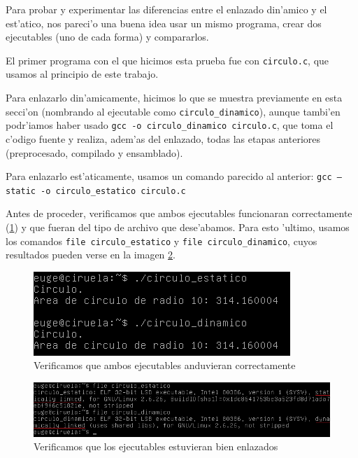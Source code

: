 \documentclass[11pt]{article}
\begin{document}
		Para probar y experimentar las diferencias entre el enlazado din'amico y el est'atico, nos pareci'o una buena idea usar un mismo programa, crear dos ejecutables (uno de cada forma) y compararlos.

		El primer programa con el que hicimos esta prueba fue con \texttt{circulo.c}, que usamos al principio de este trabajo.

		Para enlazarlo din'amicamente, hicimos lo que se muestra previamente en esta secci'on (nombrando al ejecutable como \texttt{circulo\_dinamico}), aunque tambi'en podr'iamos haber usado \texttt{gcc -o circulo\_dinamico circulo.c}, que toma el c'odigo fuente y realiza, adem'as del enlazado, todas las etapas anteriores (preprocesado, compilado y ensamblado).

		Para enlazarlo est'aticamente, usamos un comando parecido al anterior: \texttt{gcc --static -o circulo\_estatico circulo.c}

		Antes de proceder, verificamos que ambos ejecutables funcionaran correctamente (\ref{fig:stat-dyn-prog2}) y que fueran del tipo de archivo que dese'abamos. Para esto 'ultimo, usamos los comandos \texttt{file circulo\_estatico} y \texttt{file circulo\_dinamico}, cuyos resultados pueden verse en la imagen \ref{fig:bien_enlazados}.

		\begin{figure}[H]
			\centering
   			\includegraphics{Images/Seccion 1/ambos_andan.png}
    		\caption{Verificamos que ambos ejecutables anduvieran correctamente}
    		\label{fig:stat-dyn-prog2}
		\end{figure}

		\begin{figure}[H]
    			\centering
    			\includegraphics[scale=0.65]{Images/Seccion 1/bien_enlazados_.png}
    			\caption{Verificamos que los ejecutables estuvieran bien enlazados}
    			\label{fig:bien_enlazados}
		\end{figure}
 
\end{document}
